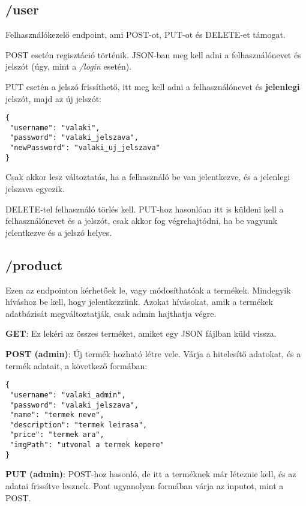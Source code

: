\documentclass[]{article}
\begin{document}
\subsection{/user}

Felhasználókezelő endpoint, ami POST-ot, PUT-ot és DELETE-et támogat.

POST esetén regisztáció történik. JSON-ban meg kell adni a felhasználónevet és jelszót (úgy, mint a \textit{/login} esetén).

PUT esetén a jelszó frissíthető, itt meg kell adni a felhasználónevet és \textbf{jelenlegi} jelszót, majd az új jelszót:

\bigskip
\begin{lstlisting}
{
 "username": "valaki",
 "password": "valaki_jelszava",
 "newPassword": "valaki_uj_jelszava"
}
\end{lstlisting}

Csak akkor lesz változtatás, ha a felhasználó be van jelentkezve, és a jelenlegi jelszava egyezik.

DELETE-tel felhasználó törlés kell. PUT-hoz hasonlóan itt is küldeni kell a felhasználónevet és a jelszót, csak akkor fog végrehajtódni, ha be vagyunk jelentkezve és a jelszó helyes.

\subsection{/product}

Ezen az endpointon kérhetőek le, vagy módosíthatóak a termékek. Mindegyik híváshoz be kell, hogy jelentkezzünk. Azokat hívásokat, amik a termékek adatbázisát megváltoztatják, csak admin hajthatja végre.

\noindent
\textbf{GET}: Ez lekéri az összes terméket, amiket egy JSON fájlban küld vissza.

\noindent
\textbf{POST (admin)}: Új termék hozható létre vele. Várja a hitelesítő adatokat, és a termék adatait, a következő formában:

\bigskip
\begin{lstlisting}
{
 "username": "valaki_admin",
 "password": "valaki_jelszava",
 "name": "termek neve",
 "description": "termek leirasa",
 "price": "termek ara",
 "imgPath": "utvonal a termek kepere"
}
\end{lstlisting}

\bigskip
\noindent
\textbf{PUT (admin)}: POST-hoz hasonló, de itt a terméknek már léteznie kell, és az adatai frissítve lesznek. Pont ugyanolyan formában várja az inputot, mint a POST.
\end{document}
